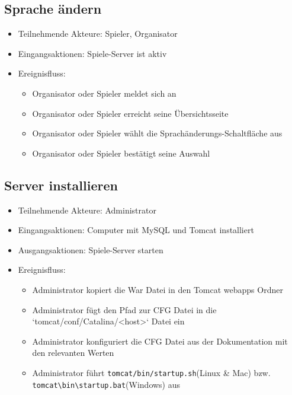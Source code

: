 \documentclass[a4paper]{scrreprt}
\begin{document}
     \subsection{Sprache ändern}
    \begin{itemize}
    \item Teilnehmende Akteure: \Gls{Spieler}, \Gls{Organisator}
    \item Eingangsaktionen: Spiele-Server ist aktiv
    \item Ereignisfluss:
        \begin{itemize}
            \item \Gls{Organisator} oder \Gls{Spieler} meldet sich an
            \item \Gls{Organisator} oder \Gls{Spieler} erreicht seine Übersichtsseite
            \item \Gls{Organisator} oder \Gls{Spieler} wählt die Sprachänderungs-Schaltfläche aus
            \item \Gls{Organisator} oder \Gls{Spieler} bestätigt seine Auswahl
        \end{itemize}
    \end{itemize}
    \subsection{Server installieren}
    \begin{itemize}
        \item Teilnehmende Akteure: \Gls{Administrator} 
        \item Eingangsaktionen: Computer mit MySQL und Tomcat installiert
        \item Ausgangsaktionen: Spiele-Server starten
        \item Ereignisfluss: 
            \begin{itemize}
                \item \Gls{Administrator} kopiert die War Datei in den Tomcat webapps Ordner
                \item \Gls{Administrator} fügt den Pfad zur CFG Datei in die `tomcat/conf/Catalina/<host>` Datei ein
                \item \Gls{Administrator} konfiguriert die CFG Datei aus der Dokumentation mit den relevanten Werten
                \item \Gls{Administrator} führt \texttt{tomcat/bin/startup.sh}(Linux \& Mac) bzw. \texttt{tomcat\textbackslash bin\textbackslash startup.bat}(Windows) aus
            \end{itemize}
    \end{itemize}
\end{document}
